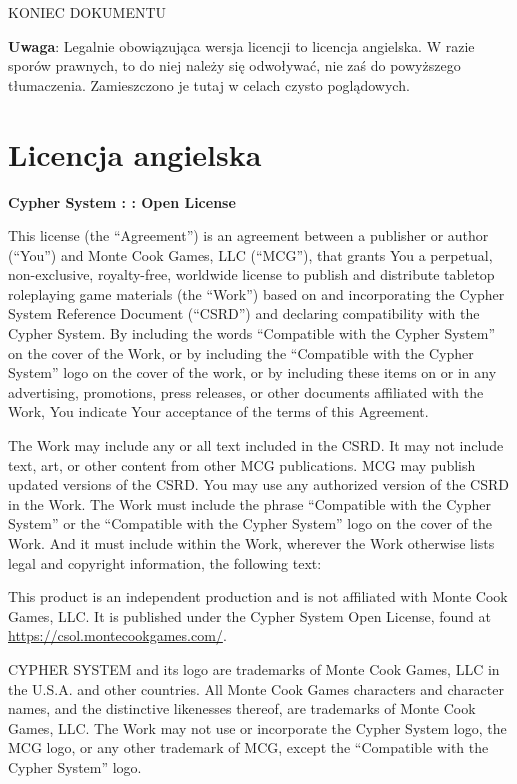 KONIEC DOKUMENTU

{ \color{red} \textbf{Uwaga}}: Legalnie obowiązująca wersja licencji to licencja angielska. W razie sporów prawnych, to do niej należy się odwoływać, nie zaś do powyższego tłumaczenia. Zamieszczono je tutaj w celach czysto poglądowych.

\section{Licencja angielska}

\textbf{Cypher System : : Open License}

This license (the “Agreement”) is an agreement between a publisher or author (“You”) and Monte Cook Games, LLC (“MCG”), that grants You a perpetual, non-exclusive, royalty-free, worldwide license to publish and distribute tabletop roleplaying game materials (the “Work”) based on and incorporating the Cypher System Reference Document (“CSRD”) and declaring compatibility with the Cypher System. By including the words “Compatible with the Cypher System” on the cover of the Work, or by including the “Compatible with the Cypher System” logo on the cover of the work, or by including these items on or in any advertising, promotions, press releases, or other documents affiliated with the Work, You indicate Your acceptance of the terms of this Agreement.

The Work may include any or all text included in the CSRD. It may not include text, art, or other content from other MCG publications. MCG may publish updated versions of the CSRD. You may use any authorized version of the CSRD in the Work.
The Work must include the phrase “Compatible with the Cypher System” or the “Compatible with the Cypher System” logo on the cover of the Work. And it must include within the Work, wherever the Work otherwise lists legal and copyright information, the following text:

\begin{displayquote}
This product is an independent production and is not affiliated with Monte Cook Games, LLC. It is published under the Cypher System Open License, found at \url{https://csol.montecookgames.com/}.

CYPHER SYSTEM and its logo are trademarks of Monte Cook Games, LLC in the U.S.A. and other countries. All Monte Cook Games characters and character names, and the distinctive likenesses thereof, are trademarks of Monte Cook Games, LLC.
The Work may not use or incorporate the Cypher System logo, the MCG logo, or any other trademark of MCG, except the “Compatible with the Cypher System” logo.
\end{displayquote}

